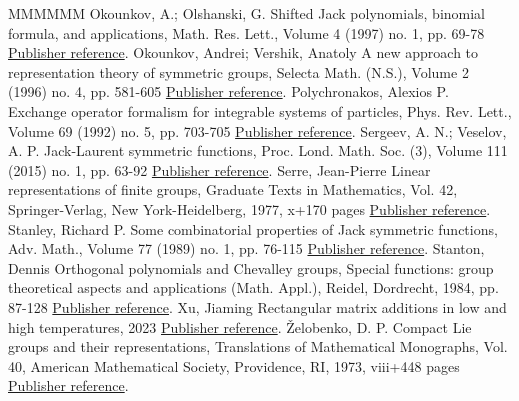 \begin{thebibliography}{MMMMMM}
 Okounkov, A.; Olshanski, G. Shifted Jack polynomials, binomial formula, and applications, Math. Res. Lett., Volume 4 (1997) no. 1, pp. 69-78 \href{https://alco.centre-mersenne.org/articles/10.5802/alco.451/#okounkov1997shifted}{Publisher reference}.
 Okounkov, Andrei; Vershik, Anatoly A new approach to representation theory of symmetric groups, Selecta Math. (N.S.), Volume 2 (1996) no. 4, pp. 581-605 \href{https://alco.centre-mersenne.org/articles/10.5802/alco.451/#okounkov1996new}{Publisher reference}.
 Polychronakos, Alexios P. Exchange operator formalism for integrable systems of particles, Phys. Rev. Lett., Volume 69 (1992) no. 5, pp. 703-705 \href{https://alco.centre-mersenne.org/articles/10.5802/alco.451/#polychronakos1992exchange}{Publisher reference}.
 Sergeev, A. N.; Veselov, A. P. Jack-Laurent symmetric functions, Proc. Lond. Math. Soc. (3), Volume 111 (2015) no. 1, pp. 63-92 \href{https://alco.centre-mersenne.org/articles/10.5802/alco.451/#sergeev2015jack}{Publisher reference}.
 Serre, Jean-Pierre Linear representations of finite groups, Graduate Texts in Mathematics, Vol. 42, Springer-Verlag, New York-Heidelberg, 1977, x+170 pages \href{https://alco.centre-mersenne.org/articles/10.5802/alco.451/#serre1977linear}{Publisher reference}.
 Stanley, Richard P. Some combinatorial properties of Jack symmetric functions, Adv. Math., Volume 77 (1989) no. 1, pp. 76-115 \href{https://alco.centre-mersenne.org/articles/10.5802/alco.451/#stanley1989some}{Publisher reference}.
 Stanton, Dennis Orthogonal polynomials and Chevalley groups, Special functions: group theoretical aspects and applications (Math. Appl.), Reidel, Dordrecht, 1984, pp. 87-128 \href{https://alco.centre-mersenne.org/articles/10.5802/alco.451/#Stanton1984}{Publisher reference}.
 Xu, Jiaming Rectangular matrix additions in low and high temperatures, 2023 \href{https://alco.centre-mersenne.org/articles/10.5802/alco.451/#xu2023rectangular}{Publisher reference}.
 Želobenko, D. P. Compact Lie groups and their representations, Translations of Mathematical Monographs, Vol. 40, American Mathematical Society, Providence, RI, 1973, viii+448 pages \href{https://alco.centre-mersenne.org/articles/10.5802/alco.451/#zhelobenko1973compact}{Publisher reference}.
\end{thebibliography}
